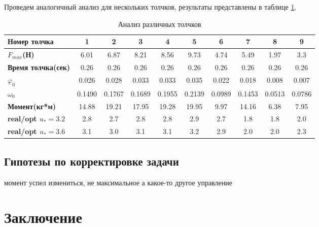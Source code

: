 \documentclass[a4paper,12pt, openany]{book}
\theoremstyle{plain} %
\theoremstyle{definition} %
\theoremstyle{remark} %
\numberwithin{equation}{chapter}
\begin{document}
{Проведем аналогичный анализ для нескольких толчков,
 результаты представлены в таблице \ref{final_table}.

 
 \begin{table}[h!]
    \centering
    \begin{tabular}{|l|c|c|c|c|c|c|c|c|c|}
    \hline
    \textbf{Номер толчка} & \textbf{1} & \textbf{2} & \textbf{3} & \textbf{4} & \textbf{5} & \textbf{6} & \textbf{7} & \textbf{8} & \textbf{9} \\ \hline
    \textbf{$F_{max}$(Н)}       & 6.01  & 6.87  & 8.21  & 8.56  & 9.73  & 4.74  & 5.49  & 1.97  & 3.3   \\ \hline
    \textbf{Время толчка(сек)}  & 0.26  & 0.26  & 0.26  & 0.26  & 0.26  & 0.26  & 0.26  & 0.26  & 0.26  \\ \hline
    \textbf{$\varphi_0$}           & 0.026 & 0.028 & 0.033 & 0.033 & 0.035 & 0.022 & 0.018 & 0.008 & 0.007 \\ \hline
    \textbf{$\omega_0$}   & 0.1490     & 0.1767     & 0.1689     & 0.1955     & 0.2139     & 0.0989     & 0.1453     & 0.0513     & 0.0786     \\ \hline
    \textbf{Момент(кг*м)}       & 14.88 & 19.21 & 17.95 & 19.28 & 19.95 & 9.97  & 14.16 & 6.38  & 7.95  \\ \hline
    \textbf{real/opt $u_*=3.2$} & 2.8   & 2.7   & 2.8   & 2.8   & 2.9   & 2.7   & 1.8   & 1.8   & 2.0   \\ \hline
    \textbf{real/opt $u_*=3.6$} & 3.1   & 3.0   & 3.1   & 3.1   & 3.2   & 2.9   & 2.0   & 2.0   & 2.3   \\ \hline
    \end{tabular}
    \caption{Анализ различных толчков}
    \label{final_table}
    \end{table}

\section{Гипотезы по корректировке задачи}
момент успел измениться, не максимальное а какое-то другое управление


\newpage


\chapter*{Заключение}



}
\end{document}
